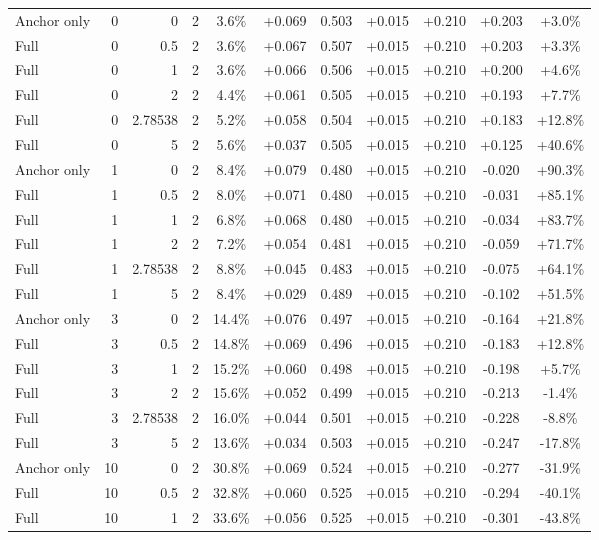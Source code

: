 \begin{table}[htbp]
\begin{tabular}{lrrrccccccc}
Anchor only & 0 & 0 & 2 & 3.6\% & +0.069 & 0.503 & +0.015 & +0.210 & +0.203 & +3.0\% \\
Full & 0 & 0.5 & 2 & 3.6\% & +0.067 & 0.507 & +0.015 & +0.210 & +0.203 & +3.3\% \\
Full & 0 & 1 & 2 & 3.6\% & +0.066 & 0.506 & +0.015 & +0.210 & +0.200 & +4.6\% \\
Full & 0 & 2 & 2 & 4.4\% & +0.061 & 0.505 & +0.015 & +0.210 & +0.193 & +7.7\% \\
Full & 0 & 2.78538 & 2 & 5.2\% & +0.058 & 0.504 & +0.015 & +0.210 & +0.183 & +12.8\% \\
Full & 0 & 5 & 2 & 5.6\% & +0.037 & 0.505 & +0.015 & +0.210 & +0.125 & +40.6\% \\
Anchor only & 1 & 0 & 2 & 8.4\% & +0.079 & 0.480 & +0.015 & +0.210 & -0.020 & +90.3\% \\
Full & 1 & 0.5 & 2 & 8.0\% & +0.071 & 0.480 & +0.015 & +0.210 & -0.031 & +85.1\% \\
Full & 1 & 1 & 2 & 6.8\% & +0.068 & 0.480 & +0.015 & +0.210 & -0.034 & +83.7\% \\
Full & 1 & 2 & 2 & 7.2\% & +0.054 & 0.481 & +0.015 & +0.210 & -0.059 & +71.7\% \\
Full & 1 & 2.78538 & 2 & 8.8\% & +0.045 & 0.483 & +0.015 & +0.210 & -0.075 & +64.1\% \\
Full & 1 & 5 & 2 & 8.4\% & +0.029 & 0.489 & +0.015 & +0.210 & -0.102 & +51.5\% \\
Anchor only & 3 & 0 & 2 & 14.4\% & +0.076 & 0.497 & +0.015 & +0.210 & -0.164 & +21.8\% \\
Full & 3 & 0.5 & 2 & 14.8\% & +0.069 & 0.496 & +0.015 & +0.210 & -0.183 & +12.8\% \\
Full & 3 & 1 & 2 & 15.2\% & +0.060 & 0.498 & +0.015 & +0.210 & -0.198 & +5.7\% \\
Full & 3 & 2 & 2 & 15.6\% & +0.052 & 0.499 & +0.015 & +0.210 & -0.213 & -1.4\% \\
Full & 3 & 2.78538 & 2 & 16.0\% & +0.044 & 0.501 & +0.015 & +0.210 & -0.228 & -8.8\% \\
Full & 3 & 5 & 2 & 13.6\% & +0.034 & 0.503 & +0.015 & +0.210 & -0.247 & -17.8\% \\
Anchor only & 10 & 0 & 2 & 30.8\% & +0.069 & 0.524 & +0.015 & +0.210 & -0.277 & -31.9\% \\
Full & 10 & 0.5 & 2 & 32.8\% & +0.060 & 0.525 & +0.015 & +0.210 & -0.294 & -40.1\% \\
Full & 10 & 1 & 2 & 33.6\% & +0.056 & 0.525 & +0.015 & +0.210 & -0.301 & -43.8\% \\

\end{tabular}
\end{table}

